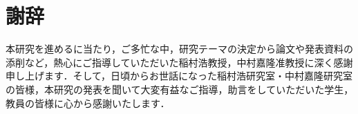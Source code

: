 \chapter*{謝辞}

本研究を進めるに当たり，ご多忙な中，研究テーマの決定から論文や発表資料の添削など，熱心にご指導していただいた稲村浩教授，中村嘉隆准教授に深く感謝申し上げます．そして，日頃からお世話になった稲村浩研究室・中村嘉隆研究室の皆様，本研究の発表を聞いて大変有益なご指導，助言をしていただいた学生，教員の皆様に心から感謝いたします．